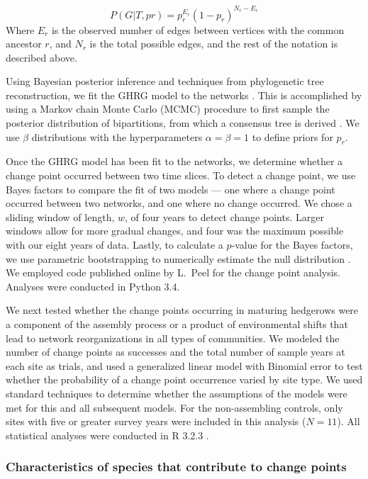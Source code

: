 \documentclass[12pt]{article}
\begin{document}
\begin{equation}
  \label{eq:lik}
  P(G|T,{pr}) = p_r^{E_r}(1-p_r)^{N_r-E_r}
\end{equation}
% 
Where $E_r$ is the observed number of edges between vertices with the
common ancestor $r$, and $N_r$ is the total possible edges, and the
rest of the notation is described above.

Using Bayesian posterior inference and techniques from phylogenetic
tree reconstruction, we fit the GHRG model to the networks
\citep{peel2014detecting}. This is accomplished by using a Markov
chain Monte Carlo (MCMC) procedure to first sample the posterior
distribution of bipartitions, from which a consensus tree is derived
\citep{peel2014detecting}. We use $\beta$ distributions with the
hyperparameters $\alpha=\beta=1$ to define priors for $p_r$.

Once the GHRG model has been fit to the networks, we determine whether
a change point occurred between two time slices. To detect a change
point, we use Bayes factors to compare the fit of two models --- one
where a change point occurred between two networks, and one where no
change occurred. We chose a sliding window of length, $w$, of four
years to detect change points. Larger windows allow for more gradual
changes, and four was the maximum possible with our eight years of
data. Lastly, to calculate a $p$-value for the Bayes factors, we use
parametric bootstrapping to numerically estimate the null distribution
\citep{peel2014detecting}. We employed code published online by
L.~Peel for the change point analysis. Analyses were conducted in
Python 3.4.

We next tested whether the change points occurring in maturing
hedgerows were a component of the assembly process or a product of
environmental shifts that lead to network reorganizations in all types
of communities. We modeled the number of change points as successes
and the total number of sample years at each site as trials, and used
a generalized linear model with Binomial error to test whether the
probability of a change point occurrence varied by site type. We used
standard techniques to determine whether the assumptions of the models
were met for this and all subsequent models. For the non-assembling
controls, only sites with five or greater survey years were included
in this analysis ($N=11$). All statistical analyses were conducted in
R 3.2.3 \citep{R}.

\subsubsection*{Characteristics of species that contribute to change
  points}
\end{document}
